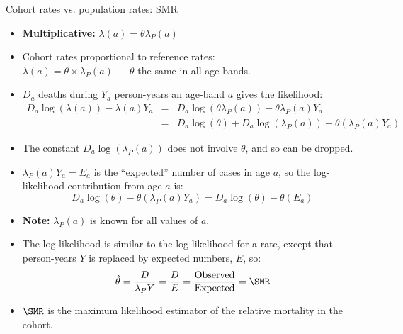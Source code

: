 \begin{frame}{Cohort rates vs. population rates: SMR}
  \begin{itemize}
  \item \textbf{Multiplicative:} $\lambda(a) = \theta \lambda_P(a)$
  \item Cohort rates proportional to reference rates:\\
    $\lambda(a) = \theta \times \lambda_P(a)$ --- $\theta$ the same in all
    age-bands.
  \item $D_a$ deaths during $Y_a$ person-years an age-band $a$ gives
    the likelihood:
\begin{eqnarray*}
    D_a \log(\lambda(a)) - \lambda(a) Y_a
  & = & D_a \log(\theta\lambda_P(a)) - \theta\lambda_P(a) Y_a \\
  & = & D_a \log(\theta)+ D_a \log(\lambda_P(a)) %
        - \theta(\lambda_P(a) Y_a) 
\end{eqnarray*}
\item The constant $D_a \log(\lambda_P(a))$ does not involve $\theta$,
  and so can be dropped.
\end{itemize}
\end{frame}

\begin{frame}
  \begin{itemize}
  \item $\lambda_P(a)Y_a = E_a$ is the ``expected'' number of cases in
    age $a$, so the log-likelihood contribution from age $a$ is:
\[
 D_a \log(\theta) - \theta(\lambda_P(a) Y_a) =
 D_a \log(\theta) - \theta(E_a) 
\]
\item \textbf{Note:} $\lambda_P(a)$ is known for all values of $a$.
\item The log-likelihood is similar to the log-likelihood for a rate, except
  that person-years $Y$ is replaced by expected numbers, $E$, so:
\[
  \hat\theta = \frac{D}{\lambda_PY} = \frac{D}{E} =
  \frac{\mbox{Observed}}{\mbox{Expected}}
  = \SMR
\]
\item $\SMR$ is the maximum likelihood estimator of the relative
  mortality in the cohort.
\end{itemize}
\end{frame}

